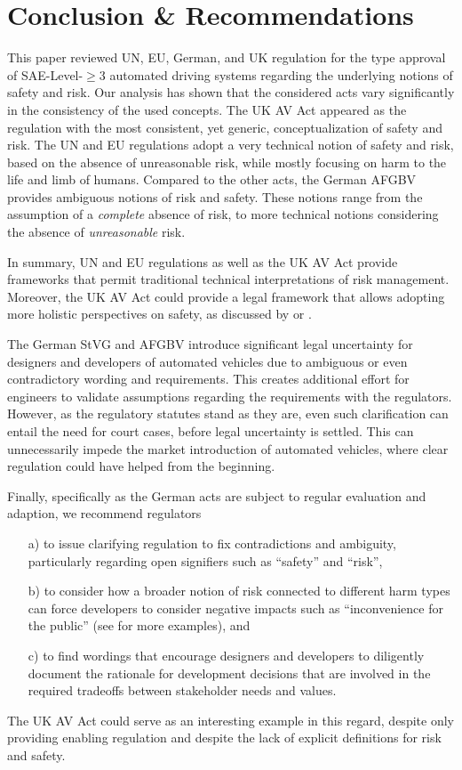 \section{Conclusion \& Recommendations}
\label{sec:conclusion}
This paper reviewed UN, EU, German, and UK regulation for the type approval of SAE-Level-$\geq$3 automated driving systems regarding the underlying notions of safety and risk.
Our analysis has shown that the considered acts vary significantly in the consistency of the used concepts.
The UK AV Act appeared as the regulation with the most consistent, yet generic, conceptualization of safety and risk.
The UN and EU regulations adopt a very technical notion of safety and risk, based on the absence of unreasonable risk, while mostly focusing on harm to the life and limb of humans.
Compared to the other acts, the German AFGBV provides ambiguous notions of risk and safety.
These notions range from the assumption of a \emph{complete} absence of risk, to more technical notions considering the absence of \emph{unreasonable} risk.

In summary, UN and EU regulations as well as the UK AV Act provide frameworks that permit traditional technical interpretations of risk management.
Moreover, the UK AV Act could provide a legal framework that allows adopting more holistic perspectives on safety, as discussed by \parencite{salem2024} or \parencite{koopman2024}.

The German StVG and AFGBV introduce significant legal uncertainty for designers and developers of automated vehicles due to ambiguous or even contradictory wording and requirements.
This creates additional effort for engineers to validate assumptions regarding the requirements with the regulators.
However, as the regulatory statutes stand as they are, even such clarification can entail the need for court cases, before legal uncertainty is settled.
This can unnecessarily impede the market introduction of automated vehicles, where clear regulation could have helped from the beginning.

Finally, specifically as the German acts are subject to regular evaluation and adaption, we recommend regulators
\begin{enumerate}
    \item[a)] to issue clarifying regulation to fix contradictions and ambiguity, particularly regarding open signifiers such as ``safety'' and ``risk'',
    \item[b)] to consider how a broader notion of risk connected to different harm types can force developers to consider negative impacts such as ``inconvenience for the public'' (see \parencite{koopman2024} for more examples), and
    \item[c)] to find wordings that encourage designers and developers to diligently document the rationale for development decisions that are involved in the required tradeoffs between stakeholder needs and values. 
\end{enumerate}

The UK AV Act could serve as an interesting example in this regard, despite only providing enabling regulation and despite the lack of explicit definitions for risk and safety.









